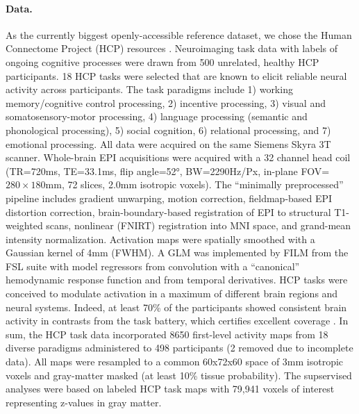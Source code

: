 \documentclass{article} %
\begin{document}
\paragraph{Data.}
As the currently biggest openly-accessible reference dataset,
we chose the Human Connectome Project (HCP) resources
\cite{barch2013}.
Neuroimaging task data with labels of ongoing cognitive processes
were drawn from 500 unrelated,
healthy HCP participants.
18 HCP tasks 
were selected that are known to elicit reliable neural activity
across participants.
The task paradigms include
1) working memory/cognitive control processing, 2)
incentive processing, 3) visual and somatosensory-motor processing,
4) language processing (semantic and phonological processing),
5) social cognition, 6) relational processing, and 7) emotional
processing. All data were acquired on the same Siemens Skyra 3T scanner.
Whole-brain EPI acquisitions were acquired with a
32 channel head coil (TR=720ms, TE=33.1ms, flip angle=52°, BW=2290Hz/Px,
in-plane FOV=$280\times180$mm, 72 slices, 2.0mm isotropic voxels).
The ``minimally preprocessed'' pipeline includes
gradient unwarping, motion correction, fieldmap-based EPI distortion
correction, brain-boundary-based registration of EPI to structural
T1-weighted scans, nonlinear (FNIRT) registration into MNI space,
and grand-mean intensity normalization. Activation maps were spatially
smoothed with a Gaussian kernel of 4mm (FWHM). A GLM was
implemented by FILM from the FSL suite with model regressors from convolution
with a “canonical” hemodynamic response function and from temporal derivatives.
HCP tasks were conceived to modulate activation
in a maximum of different brain regions and neural systems. Indeed, at
least 70\% of the participants showed consistent brain activity in
contrasts from the task battery, which certifies excellent
coverage \cite{barch2013}.
%
%
In sum, the HCP task data incorporated 8650 first-level activity maps
from 18 diverse paradigms administered to 498 participants (2 removed
due to incomplete data).
All maps were resampled to a common 60x72x60 space of
3mm isotropic voxels and gray-matter masked (at least 10\% tissue
probability).
The supservised analyses were based on labeled HCP task maps with
79,941 voxels of interest representing z-values in gray matter.
\end{document}
